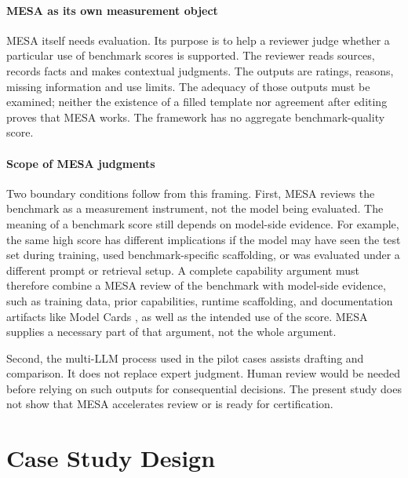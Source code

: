 \documentclass[conference]{IEEEtran}
\begin{document}
    \paragraph{MESA as its own measurement object}
    MESA itself needs evaluation. Its purpose is to help a reviewer judge whether a particular use of benchmark scores is supported. The reviewer reads sources, records facts and makes contextual judgments. The outputs are ratings, reasons, missing information and use limits. The adequacy of those outputs must be examined; neither the existence of a filled template nor agreement after editing proves that MESA works. The framework has no aggregate benchmark-quality score.
    
    \paragraph{Scope of MESA judgments}
    Two boundary conditions follow from this framing. First, MESA reviews the benchmark as a measurement instrument, not the model being evaluated. The meaning of a benchmark score still depends on model-side evidence. For example, the same high score has different implications if the model may have seen the test set during training, used benchmark-specific scaffolding, or was evaluated under a different prompt or retrieval setup. A complete capability argument must therefore combine a MESA review of the benchmark with model-side evidence, such as training data, prior capabilities, runtime scaffolding, and documentation artifacts like Model Cards \cite{mitchell_model_cards_2019}, as well as the intended use of the score. MESA supplies a necessary part of that argument, not the whole argument.
    
    Second, the multi-LLM process used in the pilot cases assists drafting and comparison. It does not replace expert judgment. Human review would be needed before relying on such outputs for consequential decisions. The present study does not show that MESA accelerates review or is ready for certification.

\section{Case Study Design}
\label{sec:demonstration}
\end{document}
